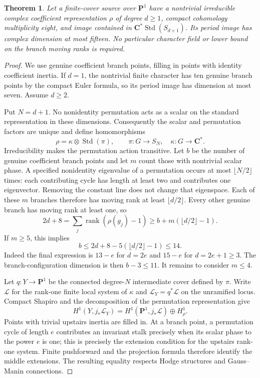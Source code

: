 \documentclass[11pt]{article}
\newtheorem{theorem}{Theorem}[section]
\theoremstyle{definition}
\theoremstyle{remark}
\newcommand{\C}{\mathbf C}
\begin{document}
\begin{theorem}\label{thm:scalar-standard-all-ranks}
Let a finite-cover source over $\mathbf P^1$ have a nontrivial
irreducible complex coefficient representation $\rho$ of degree
$d\ge1$, compact cohomology multiplicity eight, and image contained
in $\C^*\operatorname{Std}(S_{d+1})$.
Its period image has complex dimension at most fifteen.
No particular character field or lower bound on the branch moving
ranks is required.
\end{theorem}

\begin{proof}
We use genuine coefficient branch points, filling in points with
identity coefficient inertia. If $d=1$, the nontrivial finite
character has ten genuine branch points by the compact Euler formula,
so its period image has dimension at most seven. Assume $d\ge2$.

Put $N=d+1$. No nonidentity permutation acts as a scalar on the
standard representation in these dimensions. Consequently the
scalar and permutation factors are unique and define homomorphisms
\[
 \rho=\kappa\otimes\operatorname{Std}(\pi),\qquad
 \pi:G\longrightarrow S_N,\quad
 \kappa:G\longrightarrow\C^*.
\]
Irreducibility makes the permutation action transitive.
Let $b$ be the number of genuine coefficient branch points and
let $m$ count those with nontrivial scalar phase. A specified
nonidentity eigenvalue of a permutation occurs at most
$\lfloor N/2\rfloor$ times: each contributing cycle has length at
least two and contributes one eigenvector. Removing the constant
line does not change that eigenspace. Each of these $m$ branches
therefore has moving rank at least $\lfloor d/2\rfloor$.
Every other genuine branch has moving rank at least one, so
\[
 2d+8=\sum_j\operatorname{rank}(\rho(g_j)-1)
 \ge b+m(\lfloor d/2\rfloor-1).
\]
If $m\ge5$, this implies
\[
 b\le2d+8-5(\lfloor d/2\rfloor-1)\le14.
\]
Indeed the final expression is $13-e$ for $d=2e$ and $15-e$
for $d=2e+1\ge3$. The branch-configuration dimension is then
$b-3\le11$. It remains to consider $m\le4$.

Let $q:Y\to\mathbf P^1$ be the connected degree-$N$ intermediate
cover defined by $\pi$. Write $\mathcal L$ for the rank-one finite
local system of $\kappa$ and $\mathcal L_Y=q^*\mathcal L$ on the
unramified locus. Compact Shapiro and the decomposition of the
permutation representation give
\begin{equation}\label{eq:standard-shapiro}
 H^1(Y,j_*\mathcal L_Y)
 =H^1(\mathbf P^1,j_*\mathcal L)\oplus H^1_\rho.
\end{equation}
Points with trivial upstairs inertia are filled in. At a branch
point, a permutation cycle of length $e$ contributes an invariant
stalk precisely when its scalar phase to the power $e$ is one;
this is precisely the extension condition for the upstairs
rank-one system. Finite pushforward and the projection formula
therefore identify the middle extensions. The resulting equality
respects Hodge structures and Gauss--Manin connections.


\end{proof}
\end{document}
